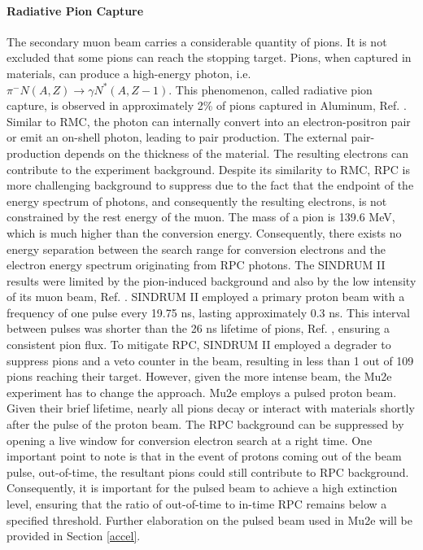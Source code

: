 \paragraph{Radiative Pion Capture}
The secondary muon beam carries a considerable quantity of pions.  It is not excluded that some pions can reach the stopping target. Pions, when captured in materials, can produce a high-energy photon, i.e. $\pi^- N(A,Z) \rightarrow \gamma N ^* (A,Z-1)$. This phenomenon, called radiative pion capture, is observed in approximately 2\% of pions captured in Aluminum, Ref. \cite{PhysRevC.5.1867}. Similar to RMC, the photon can internally convert into an electron-positron pair or emit an on-shell photon, leading to pair production. The external pair-production depends on the thickness of the material. The resulting electrons can contribute to the experiment background. Despite its similarity to RMC, RPC is more challenging background to suppress due to the fact that the endpoint of the energy spectrum of photons, and consequently the resulting electrons, is not constrained by the rest energy of the muon. The mass of a pion is 139.6 MeV, which is much higher than the conversion energy. Consequently, there exists no energy separation between the search range for conversion electrons and the electron energy spectrum originating from RPC photons. The SINDRUM II results were limited by the pion-induced background and also by the low intensity of its muon beam, Ref. \cite{SINDRUMII:2006dvw}. SINDRUM II employed a primary proton beam with a frequency of one pulse every 19.75 ns, lasting approximately 0.3 ns. This interval between pulses was shorter than the 26 ns lifetime of pions, Ref. \cite{zyla}, ensuring a consistent pion flux. To mitigate RPC, SINDRUM II employed a degrader to suppress pions and a veto counter in the beam, resulting in less than 1 out of 109 pions reaching their target. However, given the more intense beam, the Mu2e experiment has to change the approach. Mu2e employs a pulsed proton beam. Given their brief lifetime, nearly all pions decay or interact with materials shortly after the pulse of the proton beam. The RPC background can be suppressed by opening a live window for conversion electron search at a right time. One important point to note is that in the event of protons coming out of the beam pulse, out-of-time, the resultant pions could still contribute to RPC background. Consequently, it is important for the pulsed beam to achieve a high extinction level, ensuring that the ratio of out-of-time to in-time RPC remains below a specified threshold. Further elaboration on the pulsed beam used in Mu2e will be provided in Section \ref{accel}.
